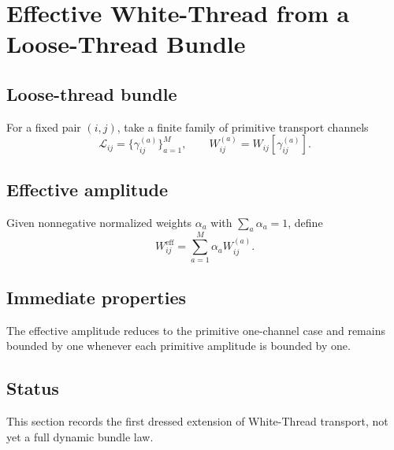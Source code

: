 \section{Effective White-Thread from a Loose-Thread Bundle}
\label{sec:effective-white-thread}

\subsection{Loose-thread bundle}
For a fixed pair $(i,j)$, take a finite family of primitive transport channels
\begin{equation}
\mathcal L_{ij} = \{\gamma_{ij}^{(a)}\}_{a=1}^{M},
\qquad
W_{ij}^{(a)} = W_{ij}[\gamma_{ij}^{(a)}].
\end{equation}

\subsection{Effective amplitude}
Given nonnegative normalized weights $\alpha_a$ with $\sum_a \alpha_a = 1$, define
\begin{equation}
W_{ij}^{\mathrm{eff}} = \sum_{a=1}^{M} \alpha_a W_{ij}^{(a)}.
\end{equation}

\subsection{Immediate properties}
The effective amplitude reduces to the primitive one-channel case and remains bounded by one whenever each primitive amplitude is bounded by one.

\subsection{Status}
This section records the first dressed extension of White-Thread transport, not yet a full dynamic bundle law.

